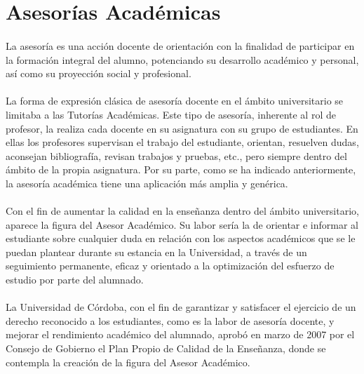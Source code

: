 \section{Asesorías Académicas}

\paragraph{}La asesoría es una acción docente de orientación con la finalidad de
participar en la formación integral del alumno, potenciando su desarrollo
académico y personal, así como su proyección social y profesional.

\paragraph{}La forma de expresión clásica de asesoría docente en el ámbito
universitario se limitaba a las Tutorías Académicas. Este tipo de asesoría,
inherente al rol de profesor, la realiza cada docente en su asignatura con su
grupo de estudiantes. En ellas los profesores supervisan el trabajo del
estudiante, orientan, resuelven dudas, aconsejan bibliografía, revisan trabajos
y pruebas, etc., pero siempre dentro del ámbito de la propia asignatura. Por su
parte, como se ha indicado anteriormente, la asesoría académica tiene una
aplicación más amplia y genérica.

\paragraph{}Con el fin de aumentar la calidad en la enseñanza dentro del ámbito
universitario, aparece la figura del Asesor Académico. Su labor sería la
de orientar e informar al estudiante sobre cualquier duda en relación con los
aspectos académicos que se le puedan plantear durante su estancia en la
Universidad, a través de un seguimiento permanente, eficaz y orientado a la
optimización del esfuerzo de estudio por parte del alumnado.

\paragraph{}La Universidad de Córdoba, con el fin de garantizar y satisfacer el
ejercicio de un derecho reconocido a los estudiantes, como es la labor de
asesoría docente, y mejorar el rendimiento académico del alumnado, aprobó en
marzo de 2007 por el Consejo de Gobierno el Plan Propio de Calidad de la
Enseñanza, donde se contempla la creación de la figura del Asesor Académico.

